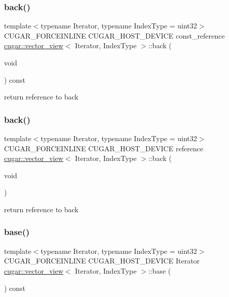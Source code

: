 \subsubsection{\texorpdfstring{back()}{back()}\hspace{0.1cm}{\footnotesize\ttfamily [1/2]}}
{\footnotesize\ttfamily template$<$typename Iterator, typename Index\+Type = uint32$>$ \\
C\+U\+G\+A\+R\+\_\+\+F\+O\+R\+C\+E\+I\+N\+L\+I\+NE C\+U\+G\+A\+R\+\_\+\+H\+O\+S\+T\+\_\+\+D\+E\+V\+I\+CE const\+\_\+reference \hyperlink{structcugar_1_1vector__view}{cugar\+::vector\+\_\+view}$<$ Iterator, Index\+Type $>$\+::back (\begin{DoxyParamCaption}\item[{void}]{ }\end{DoxyParamCaption}) const\hspace{0.3cm}{\ttfamily [inline]}}

return reference to back \mbox{\label{structcugar_1_1vector__view_a2a03b86aef7a40e55d7c7e052c94af6b}} 
\subsubsection{\texorpdfstring{back()}{back()}\hspace{0.1cm}{\footnotesize\ttfamily [2/2]}}
{\footnotesize\ttfamily template$<$typename Iterator, typename Index\+Type = uint32$>$ \\
C\+U\+G\+A\+R\+\_\+\+F\+O\+R\+C\+E\+I\+N\+L\+I\+NE C\+U\+G\+A\+R\+\_\+\+H\+O\+S\+T\+\_\+\+D\+E\+V\+I\+CE reference \hyperlink{structcugar_1_1vector__view}{cugar\+::vector\+\_\+view}$<$ Iterator, Index\+Type $>$\+::back (\begin{DoxyParamCaption}\item[{void}]{ }\end{DoxyParamCaption})\hspace{0.3cm}{\ttfamily [inline]}}

return reference to back \mbox{\label{structcugar_1_1vector__view_a0a8acdcfb98a8559b3870c685f496349}} 
\subsubsection{\texorpdfstring{base()}{base()}}
{\footnotesize\ttfamily template$<$typename Iterator, typename Index\+Type = uint32$>$ \\
C\+U\+G\+A\+R\+\_\+\+F\+O\+R\+C\+E\+I\+N\+L\+I\+NE C\+U\+G\+A\+R\+\_\+\+H\+O\+S\+T\+\_\+\+D\+E\+V\+I\+CE Iterator \hyperlink{structcugar_1_1vector__view}{cugar\+::vector\+\_\+view}$<$ Iterator, Index\+Type $>$\+::base (\begin{DoxyParamCaption}{ }\end{DoxyParamCaption}) const\hspace{0.3cm}{\ttfamily [inline]}}

